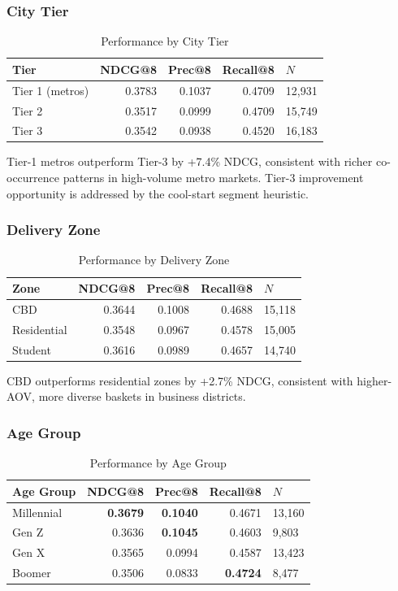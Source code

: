 \documentclass[conference]{IEEEtran}
\begin{document}
\subsubsection{City Tier}

\begin{table}[h]
\caption{Performance by City Tier}
\centering
\begin{tabular}{lrrrl}
\toprule
Tier & NDCG@8 & Prec@8 & Recall@8 & $N$ \\
\midrule
Tier 1 (metros) & 0.3783 & 0.1037 & 0.4709 & 12,931 \\
Tier 2          & 0.3517 & 0.0999 & 0.4709 & 15,749 \\
Tier 3          & 0.3542 & 0.0938 & 0.4520 & 16,183 \\
\bottomrule
\end{tabular}
\end{table}

Tier-1 metros outperform Tier-3 by +7.4\% NDCG, consistent with richer
co-occurrence patterns in high-volume metro markets. Tier-3 improvement
opportunity is addressed by the cool-start segment heuristic.

\subsubsection{Delivery Zone}

\begin{table}[h]
\caption{Performance by Delivery Zone}
\centering
\begin{tabular}{lrrrl}
\toprule
Zone & NDCG@8 & Prec@8 & Recall@8 & $N$ \\
\midrule
CBD          & 0.3644 & 0.1008 & 0.4688 & 15,118 \\
Residential  & 0.3548 & 0.0967 & 0.4578 & 15,005 \\
Student      & 0.3616 & 0.0989 & 0.4657 & 14,740 \\
\bottomrule
\end{tabular}
\end{table}

CBD outperforms residential zones by +2.7\% NDCG, consistent with
higher-AOV, more diverse baskets in business districts.

\subsubsection{Age Group}

\begin{table}[h]
\caption{Performance by Age Group}
\centering
\begin{tabular}{lrrrl}
\toprule
Age Group & NDCG@8 & Prec@8 & Recall@8 & $N$ \\
\midrule
Millennial & \textbf{0.3679} & \textbf{0.1040} & 0.4671 & 13,160 \\
Gen Z      & 0.3636 & \textbf{0.1045} & 0.4603 &  9,803 \\
Gen X      & 0.3565 & 0.0994 & 0.4587 & 13,423 \\
Boomer     & 0.3506 & 0.0833 & \textbf{0.4724} &  8,477 \\
\bottomrule
\end{tabular}
\end{table}
\end{document}
